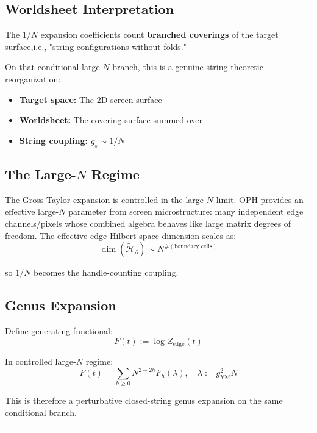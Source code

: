 \subsection{Worldsheet Interpretation}\label{52-worldsheet-interpretation}

The \(1/N\) expansion coefficients count \textbf{branched coverings} of the target surface,i.e., "string configurations without folds."

On that conditional large-\(N\) branch, this is a genuine string-theoretic reorganization:

\begin{itemize}
\tightlist
\item
  \textbf{Target space:} The 2D screen surface
\item
  \textbf{Worldsheet:} The covering surface summed over
\item
  \textbf{String coupling:} \(g_s \sim 1/N\)
\end{itemize}

\subsection{\texorpdfstring{The Large-\(N\) Regime}{The Large-N Regime}}\label{53-the-large-n-regime}

The Gross-Taylor expansion is controlled in the large-\(N\) limit. OPH provides an effective large-\(N\) parameter from screen microstructure: many independent edge channels/pixels whose combined algebra behaves like large matrix degrees of freedom. The effective edge Hilbert space dimension scales as: \[\dim(\tilde{\mathcal{H}}_\partial) \sim N^{\#(\text{boundary cells})}\]

so \(1/N\) becomes the handle-counting coupling.

\subsection{Genus Expansion}\label{54-genus-expansion}

Define generating functional: \[F(t) := \log Z_{\text{edge}}(t)\]

In controlled large-\(N\) regime: \[F(t) = \sum_{h \geq 0} N^{2-2h} F_h(\lambda), \quad \lambda := g_{\text{YM}}^2 N\]

This is therefore a perturbative closed-string genus expansion on the same conditional branch.

\begin{center}\rule{0.5\linewidth}{0.5pt}\end{center}

